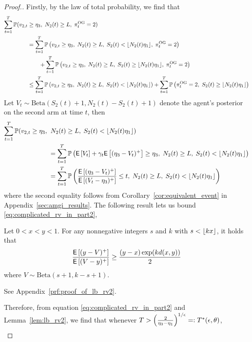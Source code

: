 \begin{proof}[Proof.]
	Firstly, by the law of total probability, we find that
	\begin{align} 
	\sum_{t=1}^T \mathbb{P}(v_{2,t} & \ge \eta_3 ,\; N_2(t) \ge L,\; \pi^{\rm OG}_t = 2) \nonumber \\
	& = \sum_{t=1}^T \mathbb{P} \left( v_{2,t} \ge \eta_3 ,\; N_2(t) \ge L, \; S_2(t) < \lfloor N_2(t) \eta_1\rfloor, \; \pi^{\rm OG}_t = 2 \right) \nonumber \\
	& \qquad + \sum_{t=1}^T \mathbb{P} \left( v_{2,t} \ge \eta_3 ,\; N_2(t) \ge L, \; S_2(t) \ge \lfloor N_2(t) \eta_1\rfloor,\; \pi^{\rm OG}_t = 2 \right) \nonumber \\
	& \le \sum_{t=1}^T \mathbb{P} \left( v_{2,t} \ge \eta_3 ,\; N_2(t) \ge L, \; S_2(t) < \lfloor N_2(t) \eta_1\rfloor \right) + \sum_{t=1}^T \mathbb{P} \left( \pi^{\rm OG}_t = 2,\; S_2(t) \ge \lfloor N_2(t) \eta_1\rfloor \right) \label{eqn:splitting_not_underestimate}
	\end{align}
	Let $V_t \sim \text{Beta}(S_2(t) + 1, N_2(t)- S_2(t) + 1)$ denote the agent's posterior on the second arm at time $t$, then
	\begin{align}
	\sum_{t=1}^T \mathbb{P}(v_{2,t} \ge \eta_3 ,\; & \; N_2(t) \ge L,\; S_2(t) < \lfloor N_2(t) \eta_1\rfloor)  \nonumber\\
	& = \sum_{t=1}^T \mathbb{P} \left( \mathsf{E} \left[ V_t \right] + \gamma_t \mathsf{E} \left[ (\eta_3 - V_t)^+ \right] \ge \eta_3, \; N_2(t) \ge L,\; S_2(t) < \lfloor N_2(t) \eta_1\rfloor \right) \nonumber \\
	& = \sum_{t=1}^T \mathbb{P} \left( \frac{\mathsf{E} \left[ (\eta_3-V_t)^+  \right]}{  \mathsf{E} \left[ (V_t - \eta_3)^+  \right]} \le t , \; N_2(t) \ge L,\; S_2(t) < \lfloor N_2(t) \eta_1\rfloor \right) \label{eq:complicated_rv_in_part2}
	\end{align}
	where the second equality follows from Corollary~\ref{cor:equivalent_event} in Appendix~\ref{sec:amgi_results}. The following result lets us bound \eqref{eq:complicated_rv_in_part2},
	\begin{lemma} \label{lem:lb_rv2}
		Let $0 < x < y < 1$. For any nonnegative integers $s$ and $k$ with $s < \lfloor kx\rfloor$, it holds that
		\begin{equation*}
		\frac{\mathsf{E} \left[ (y-V)^+  \right]}{  \mathsf{E} \left[ (V - y)^+  \right] } \ge \frac{(y-x) \exp(k d(x,y))}{2}
		\end{equation*}
		where $V \sim \text{Beta}(s+1,k-s+1)$.
	\end{lemma}
	\begin{myproof}[Proof.]
		See Appendix~\ref{prf:proof_of_lb_rv2}.
	\end{myproof}
	Therefore, from equation \eqref{eq:complicated_rv_in_part2} and Lemma~\ref{lem:lb_rv2}, we find that whenever $T > \left(\frac{2}{\eta_3-\eta_1}\right)^{1/\epsilon} =: T^*(\epsilon, \theta)$,
	\begin{align}

\end{align}
\end{proof}
